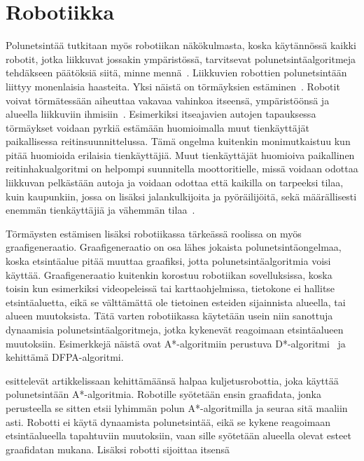 \section{Robotiikka}\label{robotiikka}
Polunetsintää tutkitaan myös robotiikan näkökulmasta, koska käytännössä 
kaikki robotit, jotka liikkuvat jossakin ympäristössä, tarvitsevat 
polunetsintäalgoritmeja tehdäkseen päätöksiä siitä, minne 
mennä~\cite{ProcediaAStar}. Liikkuvien robottien polunetsintään liittyy 
monenlaisia haasteita. Yksi näistä on törmäyksien estäminen~\cite{ACMHindawi}. 
Robotit voivat törmätessään aiheuttaa vakavaa vahinkoa itseensä, 
ympäristöönsä ja alueella liikkuviin ihmisiin~\cite{ProcediaAStar}. Esimerkiksi 
itseajavien autojen tapauksessa törmäykset voidaan pyrkiä estämään 
huomioimalla muut tienkäyttäjät paikallisessa reitin\-suun\-nittelussa. Tämä 
ongelma kuitenkin monimutkaistuu kun pitää huomioida erilaisia 
tienkäyttäjiä. Muut tienkäyttäjät huomioiva paikallinen reitinhakualgoritmi on 
helpompi suunnitella moottoritielle, missä voidaan odottaa liikkuvan 
pelkästään autoja ja voidaan odottaa että kaikilla on tarpeeksi tilaa, kuin 
kaupunkiin, jossa on lisäksi jalankulkijoita ja pyöräilijöitä, sekä 
määrällisesti enemmän tienkäyttäjiä ja vähemmän tilaa~\cite{Lanelet2}.\par
	Törmäysten estämisen lisäksi robotiikassa tärkeässä roolissa on myös 
graafigene\-raa\-tio. Graafigeneraatio on osa lähes jokaista polunetsintäongelmaa, 
koska etsintäalue pitää muuttaa graafiksi, jotta polunetsintäalgoritmia voisi 
käyttää. Graafigeneraatio kuitenkin korostuu robotiikan sovelluksissa, koska 
toisin kun esimerkiksi videopeleissä tai karttaohjelmissa, tietokone ei 
hallitse etsintäaluetta, eikä se välttämättä ole tietoinen esteiden 
sijainnista alueella, tai alueen muutoksista. Tätä varten robotiikassa 
käytetään usein niin sanottuja dynaamisia polunetsintäalgoritmeja, jotka 
kykenevät reagoimaan etsintäalueen muutoksiin. Esimerkkejä näistä ovat 
A*-algoritmiin perustuva D*-algoritmi~\cite{applSciLawande} ja 
\textcite{DelaunayVoronoiAStar} kehittämä DFPA-algoritmi. \par
	\textcite{transportRobotAStar} esittelevät artikkelissaan 
kehittämäänsä halpaa kuljetusrobottia, joka käyttää polunetsintään 
A*-algoritmia. Robotille syötetään ensin graafidata, jonka perusteella se 
sitten etsii lyhimmän polun A*-algoritmilla ja seuraa sitä maaliin asti. 
Robotti ei käytä dynaamista polunetsintää, eikä se kykene reagoimaan 
etsintäalueella tapahtuviin muutoksiin, vaan sille syötetään alueella 
o\-le\-vat esteet graafidatan mukana. Lisäksi robotti sijoittaa itsensä 
